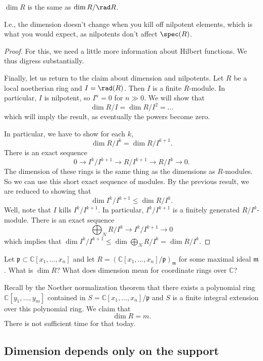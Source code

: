 \begin{proposition} 
$\dim R$ is the same as $\dim R/\rad R$.
\end{proposition} 
I.e., the dimension doesn't change when you kill off nilpotent elements, which
is what you would expect, as nilpotents don't affect $\spec (R)$.
\begin{proof} 
For this, we need a little more information about Hilbert functions.
We thus digress substantially. 


Finally, let us return to the claim about dimension and nilpotents. Let $R$ be
a local noetherian ring and $I = \rad (R)$. Then $I$ is a finite $R$-module. In
particular, $I$ is nilpotent, so $I^n  = 0$ for $n \gg 0$. We will show that
\[ \dim R/I = \dim R/I^2 = \dots \]
which will imply the result, as eventually the powers become zero. 

In particular, we have to show for each $k$, 
\[ \dim R/I^k  = \dim R/I^{k+1}.  \]
There is an exact sequence
\[ 0 \to I^k/I^{k+1} \to R/I^{k+1} \to R/I^k \to 0.  \]
The dimension of these rings is the same thing as the dimensions as
$R$-modules. So we can use this short exact sequence of modules. By the
previous result, we are reduced to showing that
\[ \dim I^k/I^{k+1} \leq \dim R/I^k.  \]
Well, note that $I$ kills $I^k/I^{k+1}$. In particular, $I^k/I^{k+1}$ is a finitely generated
$R/I^k$-module. There is an exact sequence
\[ \bigoplus_N R/I^k \to I^k/I^{k+1} \to 0  \]
which implies that $\dim I^k/I^{k+1} \leq \dim \bigoplus_N R/I^k = \dim R/I^k$.
\end{proof} 

\begin{example} 
Let $\mathfrak{p} \subset \mathbb{C}[x_1, \dots, x_n]$ and let $R =
(\mathbb{C}[x_1,\dots, x_n]/\mathfrak{p})_{\mathfrak{m}}$ for some maximal
ideal $\mathfrak{m}$. What is $\dim R$? 
What does dimension mean for coordinate rings over $\mathbb{C}$?

Recall by the Noether normalization theorem that there exists a polynomial ring
$\mathbb{C}[y_1, \dots, y_m]$ contained in $S=\mathbb{C}[x_1,\dots,
x_n]/\mathfrak{p}$ and $S$ is a finite integral extension over this polynomial ring. 
We claim that 
\[ \dim R = m.  \]
There is not sufficient time for that today. 
\end{example} 

\subsection{Dimension depends only on the support}

